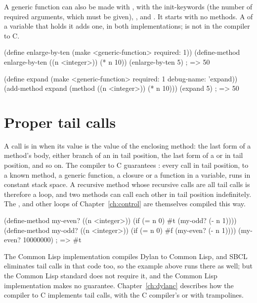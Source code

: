 \noindent A generic function can also be made with , with the
init-keywords  (the number of required arguments, which must
be given), ,  and . It starts with
no methods. A  of a variable that holds it adds one, in
both implementations;  is not in the compiler to C.

\begin{dylan}
(define enlarge-by-ten (make <generic-function> required: 1))
(define-method enlarge-by-ten ((n <integer>)) (* n 10))
(enlarge-by-ten 5)             ; => 50
\end{dylan}

\begin{dylan}
(define expand
  (make <generic-function> required: 1 debug-name: 'expand))
(add-method expand (method ((n <integer>)) (* n 10)))
(expand 5)                     ; => 50
\end{dylan}

\section{Proper tail calls}\label{sec:functions-tail-calls}

A call is in  when its value is the value of the
enclosing method: the last form of a method's body, either branch of an
 in tail position, the last form of a  or 
in tail position, and so on. The compiler to C guarantees : every call in tail position, to a known method, a generic function,
a closure or a function in a variable, runs in constant stack space. A
recursive method whose recursive calls are all tail calls is therefore a
loop, and two methods can call each other in tail position indefinitely.
The ,  and other loops of
Chapter~\ref{ch:control} are themselves compiled this way.

\begin{dylan}
(define-method my-even? ((n <integer>))
  (if (= n 0) #t (my-odd? (- n 1))))
(define-method my-odd? ((n <integer>))
  (if (= n 0) #f (my-even? (- n 1))))
(my-even? 10000000)            ; => #t
\end{dylan}

\noindent The Common Lisp implementation compiles Dylan to Common Lisp, and
SBCL eliminates tail calls in that code too, so the example above runs there
as well; but the Common Lisp standard does not require it, and the Common
Lisp implementation makes no guarantee. Chapter~\ref{ch:dylanc} describes how the
compiler to C implements tail calls, with the C compiler's 
or with trampolines.
